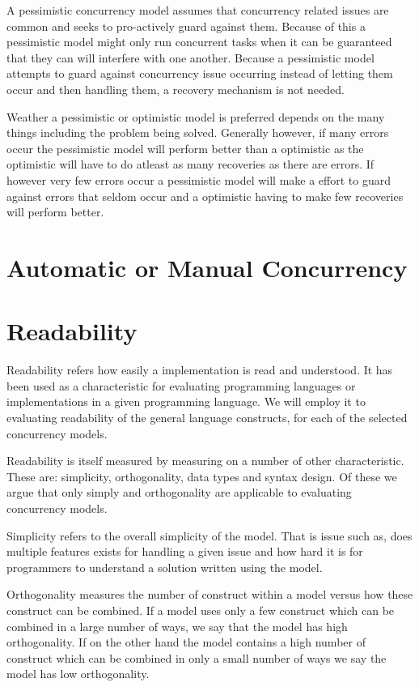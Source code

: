 A pessimistic concurrency model assumes that concurrency related issues are common and seeks to pro-actively guard against them. Because of this a pessimistic model might only run concurrent tasks when it can be guaranteed that they can will interfere with one another. Because a pessimistic model attempts to guard against concurrency issue occurring instead of letting them occur and then handling them, a recovery mechanism is not needed.

Weather a pessimistic or optimistic model is preferred depends on the many things including the problem being solved. Generally however, if many errors occur the pessimistic model will perform better than a optimistic as the optimistic will have to do atleast as many recoveries as there are errors. If however very few errors occur a pessimistic model will make a effort to guard against errors that seldom occur and a optimistic having to make few recoveries will perform better.
\section{Automatic or Manual Concurrency}
\section{Readability}\label{sec:readability}
Readability refers how easily a implementation is read and understood\cite[p. 8]{sebestaProLang}. It has been used as a characteristic for evaluating programming languages or implementations in a given programming language. We will employ it to evaluating readability of the general language constructs, for each of the selected concurrency models.

Readability is itself measured by measuring on a number of other characteristic. These are: simplicity, orthogonality, data types and syntax design. Of these we argue that only simply and orthogonality are applicable to evaluating concurrency models.

Simplicity refers to the overall simplicity of the model\cite[p. 8]{sebestaProLang}. That is issue such as, does multiple features exists for handling a given issue and how hard it is for programmers to understand a solution written using the model. 

Orthogonality measures the number of construct within a model versus how these construct can be combined\cite[p. 9]{sebestaProLang}. If a model uses only a few construct which can be combined in a large number of ways, we say that the model has high orthogonality. If on the other hand the model contains a high number of construct which can be combined in only a small number of ways we say the model has low orthogonality.

